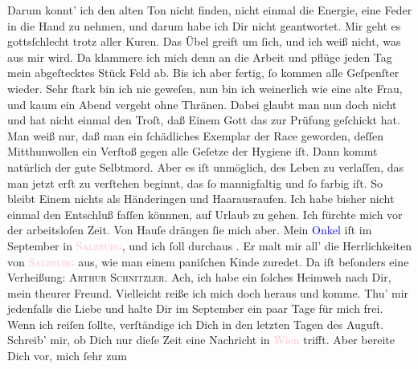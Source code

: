                Darum konnt’ ich den alten Ton nicht finden, nicht einmal die Energie, eine Feder in
               die Hand zu nehmen, und darum habe ich Dir nicht geantwortet. Mir geht es
               gottsſchlecht trotz aller Kuren. Das Übel greift um ſich, und ich weiß nicht, was aus
               mir wird. Da klammere ich mich denn an die Arbeit und pflüge jeden Tag mein
               abgeſtecktes Stück Feld ab. Bis ich aber fertig, ſo kommen alle Geſpenſter {\pb}wieder. Sehr ſtark bin ich nie geweſen, nun bin ich
               weinerlich wie eine alte Frau, und kaum ein Abend vergeht ohne Thränen. Dabei glaubt
               man nun doch nicht und hat nicht einmal den Troſt, daß Einem Gott das zur Prüfung
               geſchickt hat. Man weiß nur, daß man ein ſchädliches Exemplar der Race geworden,
               deſſen Mitthunwollen ein Verſtoß gegen alle Geſetze der Hygiene iſt. Dann kommt
               natürlich der gute Selbtmord. Aber es iſt unmöglich, des Leben zu verlaſſen, das man
               jetzt erſt zu verſtehen beginnt, das ſo mannigfaltig und ſo farbig iſt. So bleibt
               Einem nichts als Händeringen und Haarausraufen.\pend
           \pstart
           Ich habe bisher nicht einmal den Entschluß faſſen könnnen, auf Urlaub zu gehen. {\pb}Ich fürchte mich vor der arbeitsloſen Zeit. Von
               Hauſe drängen ſie mich aber. Mein \textcolor{blue}{Onkel}{} iſt im September in \textsc{\textcolor{pink}{Salzburg}{}\ledrightnote{\textcolor{pink}{Salzburg}}}, und ich ſoll durchaus \label{K_L02711-2v}\label{K_L02711-2h}. Er
               malt mir all’ die Herrlichkeiten von \textcolor{pink}{\textsc{Salzburg}}{}\ledrightnote{\textcolor{pink}{Salzburg}} aus, wie man einem paniſchen Kinde zuredet. Da iſt beſonders eine Verheißung:
                  \textsc{Arthur Schnitzler}. Ach, ich habe ein ſolches Heimweh
               nach Dir, mein theurer Freund. Vielleicht reiße ich mich doch heraus und komme. Thu’
               mir jedenfalls die Liebe und halte Dir im September ein
               paar Tage für mich frei. Wenn ich reiſen ſollte, verſtändige ich Dich {\pb}in den letzten Tagen des Auguſt. Schreib’ mir, ob Dich nur dieſe Zeit eine Nachricht in \textcolor{pink}{Wien}{}\ledrightnote{\textcolor{pink}{Wien}} trifft. Aber bereite Dich vor, mich ſehr zum
